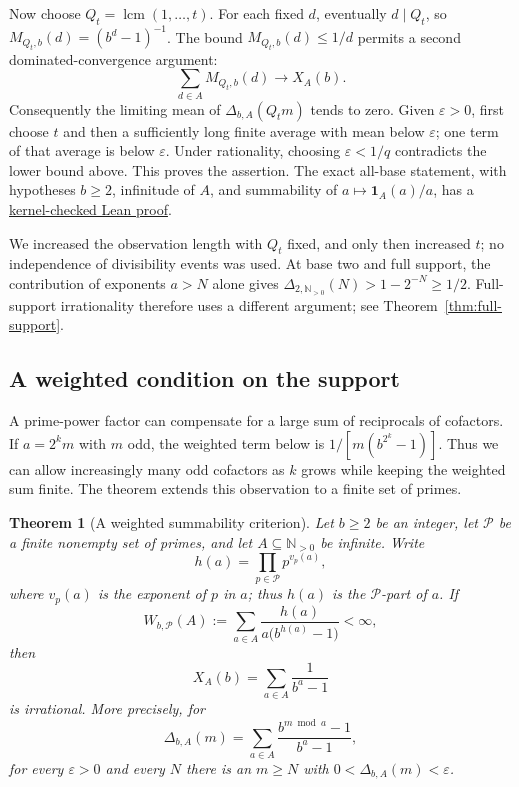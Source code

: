 \documentclass[11pt]{article}
\theoremstyle{plain}
\newtheorem{thm}{Theorem}[section]
\theoremstyle{definition}
\theoremstyle{remark}
\begin{document}
Now choose $Q_t=\operatorname{lcm}(1,\ldots,t)$. For each fixed $d$,
eventually $d\mid Q_t$, so $M_{Q_t,b}(d)=(b^d-1)^{-1}$. The bound
$M_{Q_t,b}(d)\le1/d$ permits a second dominated-convergence argument:
\[
 \sum_{d\in A}M_{Q_t,b}(d)\longrightarrow X_A(b).
\]
Consequently the limiting mean of $\Delta_{b,A}(Q_tm)$ tends to zero.
Given $\varepsilon>0$, first choose $t$ and then a sufficiently long finite
average with mean below $\varepsilon$; one term of that average is below
$\varepsilon$. Under rationality, choosing $\varepsilon<1/q$
contradicts the lower bound above.
This proves the assertion.  The exact all-base statement, with hypotheses
$b\ge2$, infinitude of $A$, and summability of $a\mapsto\mathbf1_A(a)/a$,
has a
\href{https://github.com/wcook04/plectis-erdos/blob/c91562bd574a387cde904481e609c7b4cacebb14/lean/Erdos249257/AllBaseReciprocalSupportIrrationality.lean#L395}{kernel-checked Lean proof}.

We increased the observation length with $Q_t$ fixed, and only then
increased $t$; no independence of divisibility events was used. At base two and
full support, the contribution of exponents $a>N$ alone gives
$\Delta_{2,\mathbb N_{>0}}(N)>1-2^{-N}\ge1/2$. Full-support irrationality
therefore uses a different argument; see Theorem~\ref{thm:full-support}.

\subsection{A weighted condition on the support}
A prime-power factor can compensate for a large sum of reciprocals of
cofactors. If $a=2^km$ with $m$ odd, the weighted term below is
$1/[m(b^{2^k}-1)]$. Thus we can allow increasingly many odd cofactors
as $k$ grows while keeping the weighted sum finite. The theorem extends
this observation to a finite set of primes.


\begin{thm}[A weighted summability criterion]
\label{thm:257-weighted}
Let $b\ge2$ be an integer, let $\mathcal P$ be a finite nonempty set of
primes, and let $A\subseteq\mathbb N_{>0}$ be infinite.  Write
\[
 h(a)=\prod_{p\in\mathcal P}p^{v_p(a)},
\]
where $v_p(a)$ is the exponent of $p$ in $a$; thus $h(a)$ is the
$\mathcal P$-part of $a$.  If
\begin{equation}\label{eq:257-weighted-mass}
 W_{b,\mathcal P}(A):=
 \sum_{a\in A}\frac{h(a)}{a\bigl(b^{h(a)}-1\bigr)}<\infty,
\end{equation}
then
\[
 X_A(b)=\sum_{a\in A}\frac1{b^a-1}
\]
is irrational.  More precisely, for
\[
 \Delta_{b,A}(m)=
 \sum_{a\in A}\frac{b^{m\bmod a}-1}{b^a-1},
\]
for every $\varepsilon>0$ and every $N$ there is an $m\ge N$ with
$0<\Delta_{b,A}(m)<\varepsilon$.
\end{thm}
\end{document}
